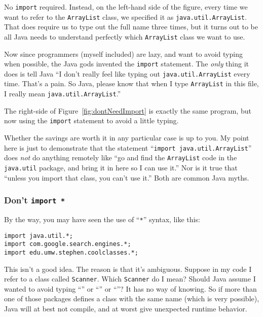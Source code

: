 No \texttt{import} required. Instead, on the left-hand side of the figure,
every time we want to refer to the \texttt{ArrayList} class, we specified it
as \texttt{java.util.ArrayList}. That does require us to type out the full
name three times, but it turns out to be all Java needs to understand
perfectly which \texttt{ArrayList} class we want to use.

Now since programmers (myself included) are lazy, and want to avoid typing
when possible, the Java gods invented the \texttt{import} statement. The
\textit{only} thing it does is tell Java ``I don't really feel like typing out
\texttt{java.util.ArrayList} every time. That's a pain. So Java, please know
that when I type \texttt{ArrayList} in this file, I really mean
\texttt{java.util.ArrayList}.''

The right-side of Figure~\ref{fig:dontNeedImport} is exactly the same program,
but now using the \texttt{import} statement to avoid a little typing.

Whether the savings are worth it in any particular case is up to you. My point
here is just to demonstrate that the statement ``\texttt{import
java.util.ArrayList}'' does \textit{not} do anything remotely like ``go and
find the \texttt{ArrayList} code in the \texttt{java.util} package, and bring
it in here so I can use it.'' Nor is it true that ``unless you import that
class, you can't use it.'' Both are common Java myths.

\subsubsection{Don't \texttt{import *}}

By the way, you may have seen the use of ``\texttt{*}'' syntax, like this:

\begin{Verbatim}[fontsize=\small,samepage=true]
import java.util.*;
import com.google.search.engines.*;
import edu.umw.stephen.coolclasses.*;
\end{Verbatim}

This isn't a good idea. The reason is that it's ambiguous. Suppose in my code
I refer to a class called \texttt{Scanner}. Which \texttt{Scanner} do I mean?
Should Java assume I wanted to avoid typing ``'' or
``'' or
``''? It has no way of knowing. So
if more than one of those packages defines a class with the same name (which
is very possible), Java will at best not compile, and at worst give unexpected
runtime behavior.

